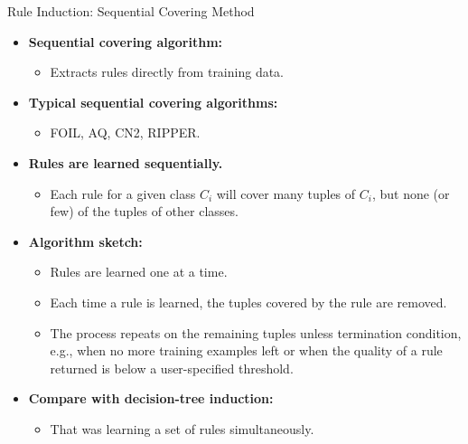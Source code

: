 \begin{frame}{Rule Induction: Sequential Covering Method}
	\begin{itemize}
		\item \textbf{Sequential covering algorithm:}
		      \begin{itemize}
			      \item Extracts rules directly from training data.
		      \end{itemize}
		\item \textbf{Typical sequential covering algorithms:}
		      \begin{itemize}
			      \item FOIL, AQ, CN2, RIPPER.
		      \end{itemize}
		\item \textbf{Rules are learned {\color{airforceblue}sequentially}.}
		      \begin{itemize}
			      \item Each rule for a given class $C_i$ will cover many tuples of $C_i$, but none (or few) of the tuples of other classes.
		      \end{itemize}
		\item \textbf{Algorithm sketch:}
		      \begin{itemize}
			      \item Rules are learned one at a time.
			      \item Each time a rule is learned, the tuples covered by the rule are removed.
			      \item The process repeats on the remaining tuples unless termination condition, e.g., when no more training examples left or when the quality of a rule returned is below a user-specified threshold.
		      \end{itemize}
		\item \textbf{Compare with decision-tree induction:}
		      \begin{itemize}
			      \item That was learning a set of rules simultaneously.
		      \end{itemize}
	\end{itemize}
\end{frame}

